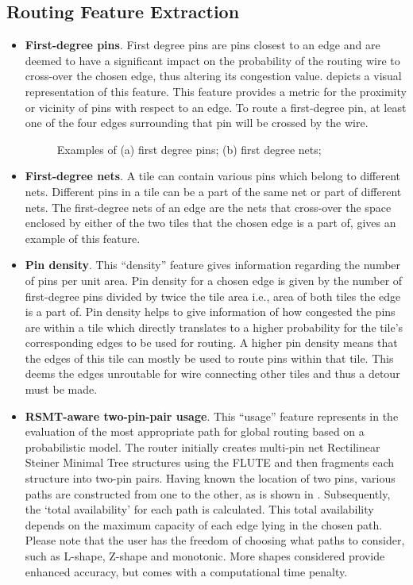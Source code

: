 \subsection{Routing Feature Extraction}
\begin{itemize}
\item \textbf{First-degree pins}. First degree pins are pins closest to an edge and are deemed to have a significant impact on the probability of the routing wire to cross-over the chosen edge, thus altering its congestion value.  depicts a visual representation of this feature. This feature provides a metric for the proximity or vicinity of pins with respect to an edge. To route a first-degree pin, at least one of the four edges surrounding that pin will be crossed by the wire.

\begin{figure}[tb!]
    \centering
    \caption{Examples of (a) first degree pins; (b) first degree nets;}
\end{figure}

\item \textbf{First-degree nets}. A tile can contain various pins which belong to different nets. Different pins in a tile can be a part of the same net or part of different nets. The first-degree nets of an edge are the nets that cross-over the space enclosed by either of the two tiles that the chosen edge is a part of,   gives an example of this feature. 

\item \textbf{Pin density}. This ``density'' feature gives information regarding the number of pins per unit area. Pin density for a chosen edge is given by the number of first-degree pins divided by twice the tile area i.e., area of both tiles the edge is a part of. Pin density helps to give information of how congested the pins are within a tile which directly translates to a higher probability for the tile's corresponding edges to be used for routing. A higher pin density means that the edges of this tile can mostly be used to route pins within that tile. This deems the edges unroutable for wire connecting other tiles and thus a detour must be made. 

\item \textbf{RSMT-aware two-pin-pair usage}. This ``usage'' feature represents in the evaluation of the most appropriate path for global routing based on a probabilistic model. The router initially creates multi-pin net Rectilinear Steiner Minimal Tree structures using the FLUTE \cite{FLUTE} and then fragments each structure into two-pin pairs. Having known the location of two pins, various paths are constructed from one to the other, as is shown in . Subsequently, the ‘total availability’ for each path is calculated. This total availability depends on the maximum capacity of each edge lying in the chosen path. Please note that the user has the freedom of choosing what paths to consider, such as L-shape, Z-shape and monotonic. More shapes considered provide enhanced accuracy, but comes with a computational time penalty.


\end{itemize}

